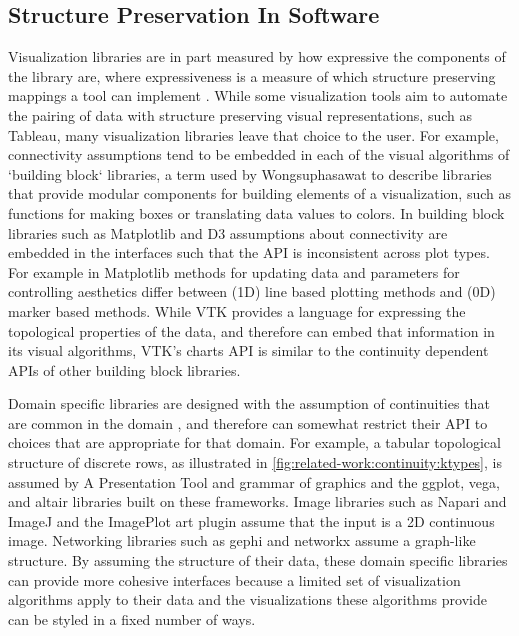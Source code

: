 \documentclass[journal]{IEEEtran}
\theoremstyle{definition}
\theoremstyle{remark}
\begin{document}
\subsection{Structure Preservation In Software}
\label{sec:related-work:software}
Visualization libraries are in part measured by how expressive the components of the library are, where expressiveness is a measure of which structure preserving mappings a tool can implement \cite{mackinlayAutomatingDesignGraphical1986}. While some visualization tools aim to automate the pairing of data with structure preserving visual representations, such as Tableau\cite{StoltePolaris2002,hanrahanVizQL2006,MackinlayShowme2007}, many visualization libraries leave that choice to the user. For example, connectivity assumptions tend to be embedded in each of the visual algorithms of `building block` libraries, a term used by Wongsuphasawat \cite{wongsuphasawatNavigatingWideWorld2021,wongsuphasawatNavigatingWideWorld2020} to describe libraries that provide modular components for building elements of a visualization, such as functions for making boxes or translating data values to colors. In building block libraries such as Matplotlib\cite{hunterMatplotlib2DGraphics2007} and D3\cite{bostockDataDrivenDocuments2011} assumptions about connectivity are embedded in the interfaces such that the API is inconsistent across plot types. For example in Matplotlib methods for updating data and parameters for controlling aesthetics differ between (1D) line based plotting methods and (0D) marker based methods. While VTK\cite{hanwellVisualizationToolkitVTK2015,geveciVTK2012} provides a language for expressing the topological properties of the data, and therefore can embed that information in its visual algorithms, VTK's charts API is similar to the continuity dependent APIs of other building block libraries.

Domain specific libraries are designed with the assumption of continuities that are common in the domain \cite{HeerSoftware2006}, and therefore can somewhat restrict their API to choices that are appropriate for that domain. For example, a tabular topological structure of discrete rows, as illustrated in \autoref{fig:related-work:continuity:ktypes}, is assumed by A Presentation Tool\cite{mackinlayAutomatingDesignGraphical1986, mackinlayAutomatingDesignGraphical1986} and grammar of graphics\cite{wilkinsonGrammarGraphics2005} and the ggplot\cite{wickhamGgplot2ElegantGraphics2016}, vega\cite{satyanarayanDeclarativeInteractionDesign2014}, and altair\cite{vanderplasAltairInteractiveStatistical2018} libraries built on these frameworks. Image libraries such as Napari\cite{nicholas_sofroniew_2021_4533308} and ImageJ\cite{schneiderNIHImageImageJ2012} and the ImagePlot\cite{studiesCulturevisImageplot2021} art plugin assume that the input is a 2D continuous image. Networking libraries such as gephi\cite{bastianGephiOpenSource2009} and networkx\cite{HagbergExploringNetwork2008} assume a graph-like structure. By assuming the structure of their data, these domain specific libraries can provide more cohesive interfaces because a limited set of visualization algorithms apply to their data and the visualizations these algorithms provide can be styled in a fixed number of ways.
\end{document}
